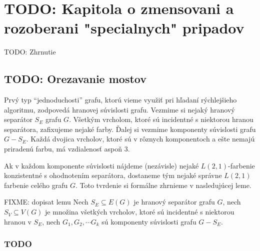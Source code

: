 \chapter{TODO: Kapitola o zmensovani a rozoberani "specialnych" pripadov}

TODO: Zhrnutie

\section{TODO: Orezavanie mostov}


Prvý typ ``jednoduchosti'' grafu, ktorú vieme využiť pri hľadaní rýchlejšieho algoritmu,
zodpovedá hranovej súvislosti grafu. Vezmime si nejaký hranový separátor $S_E$ grafu $G$. 
Všetkým vrcholom, ktoré sú incidentné s niektorou hranou separátora, zafixujeme nejaké farby.
Ďalej si vezmime komponenty súvislosti grafu $G - S_E$. Každá dvojica vrcholov, ktoré sú
v rôznych komponentoch a ešte nemajú priradenú farbu, má vzdialenosť aspoň $3$.

Ak v každom komponente súvislosti nájdeme (nezávisle) nejaké $L(2,1)$-farbenie
konzistentné s ohodnotením separátora, dostaneme tým nejaké správne $L(2,1)$ farbenie
celého grafu $G$. Toto tvrdenie si formálne zhrnieme v nasledujúcej leme.

\begin{lema}
    FIXME: dopisat lemu %
    Nech $S_E \subseteq E(G)$ je hranový separátor grafu $G$,
    nech $S_V \subseteq V(G)$ je množina všetkých vrcholov, ktoré sú incidentné s niektorou hranou
    v $S_E$, nech $G_1, G_2, \cdots G_k$ sú komponenty súvislosti grafu $G - S_E$. 
\end{lema}

\begin{defn}

\end{defn}

\subsection{TODO}

